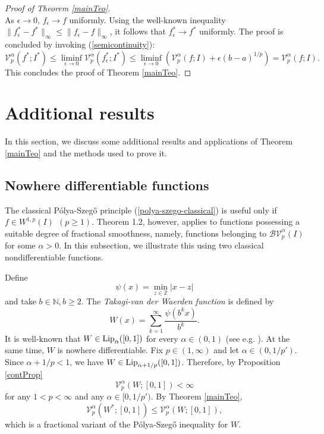 \documentclass{amsart}
\numberwithin{equation}{section}
\begin{document}
\begin{proof}[Proof of Theorem \ref{mainTeo}]
\begin{equation}
\end{equation}
As $\epsilon\rightarrow0$, $f_\epsilon\rightarrow f$ uniformly. Using the well-known inequality $\|f^*_\epsilon-f^*\|_\infty\le\|f_\epsilon-f\|_\infty$, it follows that $f^*_\epsilon\rightarrow f^*$ uniformly. The proof is concluded by invoking (\ref{semicontinuity}):
$$
\mathcal{V}_p^\alpha(f^*;I^*)\le\liminf_{\epsilon\rightarrow0}\mathcal{V}_p^\alpha(f^*_\epsilon;I^*)\le
\liminf_{\epsilon\rightarrow0}\left(\mathcal{V}_p^\alpha(f;I)+\epsilon(b-a)^{1/p}\right)=
\mathcal{V}_p^\alpha(f;I).
$$
This concludes the proof of Theorem \ref{mainTeo}.
\end{proof}


\section{Additional results}
\label{AddComm}

In this section, we discuss some additional results and applications of Theorem \ref{mainTeo} and the methods used to prove it.



\subsection{Nowhere differentiable functions}


The classical P\'{o}lya-Szeg\H{o} principle (\ref{polya-szego-classical}) is useful only if $f\in W^{1,p}(I)~~(p\ge1)$. Theorem 1.2, however, applies to functions possessing a suitable degree of fractional smoothness, namely, functions belonging to $\mathcal{BV}_p^\alpha(I)$ for some $\alpha>0$. In this subsection, we illustrate this using two classical nondifferentiable functions.


Define
\begin{equation}
    \nonumber
    \psi(x)=\min_{z\in\mathbb{Z}}|x-z|
\end{equation}
and take $b\in\mathbb{N}, b\ge2$. The 
\emph{Takagi-van der Waerden function} is defined by
\begin{equation}
        \nonumber
        W(x)=\sum_{k=1}^\infty\frac{\psi(b^kx)}{b^k}.
\end{equation}
It is well-known that $W\in{\rm Lip}_\alpha([0,1])$ for every $\alpha\in(0,1)$ (see e.g. \cite{ShSa90}). At the same time, $W$ is nowhere differentiable. Fix $p\in(1,\infty)$ and let $\alpha\in(0,1/p')$. Since $\alpha+1/p<1$, we have $W\in{\rm Lip}_{\alpha+1/p}([0,1])$. Therefore, by Proposition \ref{contProp} 
\begin{equation}
    \nonumber
    \mathcal{V}_p^\alpha(W;[0,1])<\infty
\end{equation}
for any $1<p<\infty$ and any $\alpha\in[0,1/p')$. By Theorem \ref{mainTeo}, 
\begin{equation}
    \nonumber
    \mathcal{V}_p^\alpha(W^*;[0,1])\le \mathcal{V}_p^\alpha(W;[0,1]),
\end{equation}
which is a fractional variant of the P\'{o}lya-Szeg\H{o} inequality for $W$.
\end{document}
